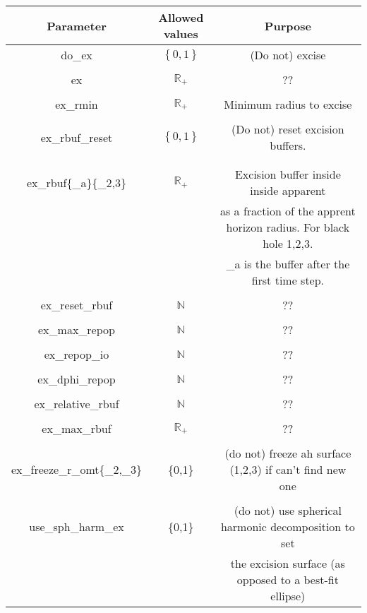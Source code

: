 \documentclass{article}
\begin{document}
\begin{table}[h]
   \centering 
   \begin{tabular}{ccc}
      Parameter  & Allowed values & Purpose \\
      \midrule\midrule
      do\_ex 
      &
      $\left\{0,1\right\}$
      &
      (Do not) excise
      \\ \\
      ex 
      &
      $\mathbb{R}_+$
      &
      ??
      \\ \\
      ex\_rmin 
      & 
      $\mathbb{R}_+$
      &
      Minimum radius to excise
      \\ \\
      ex\_rbuf\_reset
      &
      $\left\{0,1\right\}$
      &
      (Do not) reset excision buffers.
      \\
      \\ \\
      ex\_rbuf\{\_a\}\{\_2,3\}
      &
      $\mathbb{R}_+$
      &
      Excision buffer inside inside apparent
      \\
      & & 
      as a fraction of the apprent horizon radius.
      For black hole 1,2,3.
      \\
      & &
      \_a is the buffer after the first time step.
      \\ \\
      ex\_reset\_rbuf 
      &
      $\mathbb{N}$
      &
      ??
      \\ \\
      ex\_max\_repop 
      &
      $\mathbb{N}$
      &
      ??
      \\ \\
      ex\_repop\_io
      &
      $\mathbb{N}$
      &
      ??
      \\ \\
      ex\_dphi\_repop
      &
      $\mathbb{N}$
      &
      ??
      \\ \\
      ex\_relative\_rbuf
      &
      $\mathbb{N}$
      &
      ??
      \\ \\
      ex\_max\_rbuf
      &
      $\mathbb{R}_+$
      &
      ??
      \\ \\
      ex\_freeze\_r\_omt\{\_2,\_3\}
      &
      \{0,1\}
      &
      (do not) freeze ah surface (1,2,3) if can't find new one
      \\ \\
      use\_sph\_harm\_ex
      &
      \{0,1\}
      &
      (do not) use spherical harmonic decomposition to set
      \\
      & &
      the excision surface (as opposed to a best-fit ellipse) 
   \end{tabular}
\end{table}
\end{document}
